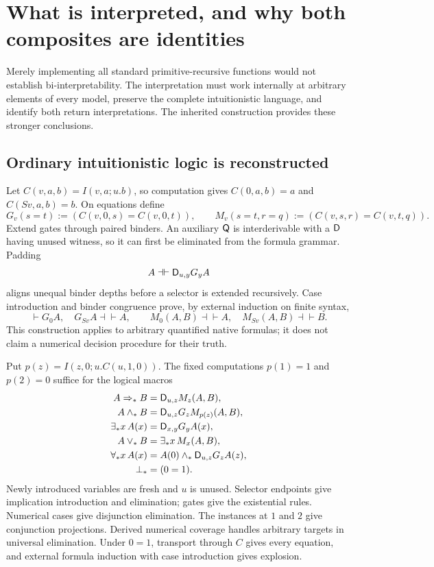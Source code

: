 \section{What is interpreted, and why both composites are identities}
\label{sec:interpretations}

Merely implementing all standard primitive-recursive functions would not
establish bi-interpretability. The interpretation must work internally
at arbitrary elements of every model, preserve the complete intuitionistic
language, and identify both return interpretations. The inherited
construction provides these stronger conclusions.

\subsection{Ordinary intuitionistic logic is reconstructed}

Let $C(v,a,b)=I(v,a;u.b)$, so computation gives
$C(0,a,b)=a$ and $C(Sv,a,b)=b$. On equations define
\[
 G_v(s=t):=(C(v,0,s)=C(v,0,t)),\qquad
 M_v(s=t,r=q):=(C(v,s,r)=C(v,t,q)).
\]
Extend gates through paired binders. An auxiliary $\mathsf Q$ is interderivable
with a $\mathsf D$ having unused witness, so it can first be eliminated from
the formula grammar. Padding
\[
 A\dashv\vdash\mathsf D_{u,y}G_yA
\]
aligns unequal binder depths before a selector is extended recursively.
Case introduction and binder congruence prove, by external induction on
finite syntax,
\[
 \vdash G_0A,\quad G_{Sv}A\dashv\vdash A,
 \qquad M_0(A,B)\dashv\vdash A,\quad M_{Sv}(A,B)\dashv\vdash B.
\]
This construction applies to arbitrary quantified native formulas;
it does not claim a numerical decision procedure for their truth.

Put $p(z)=I(z,0;u.C(u,1,0))$. The fixed computations $p(1)=1$ and
$p(2)=0$ suffice for the logical macros
\begin{align*}
 A\Rightarrow_* B&=\mathsf D_{u,z}M_z(A,B),\\
 A\land_* B&=\mathsf D_{u,z}G_zM_{p(z)}(A,B),\\
 \exists_*x\,A(x)&=\mathsf D_{x,y}G_yA(x),\\
 A\lor_* B&=\exists_*x\,M_x(A,B),\\
 \forall_*x\,A(x)&=A(0)\land_*\mathsf D_{u,z}G_zA(z),\\
 \bot_*&=(0=1).
\end{align*}
Newly introduced variables are fresh and $u$ is unused. Selector
endpoints give implication introduction and elimination; gates give
the existential rules. Numerical cases give disjunction elimination.
The instances at $1$ and $2$ give conjunction projections. Derived
numerical coverage handles arbitrary targets in universal elimination.
Under $0=1$, transport through $C$ gives every equation, and external
formula induction with case introduction gives explosion.

